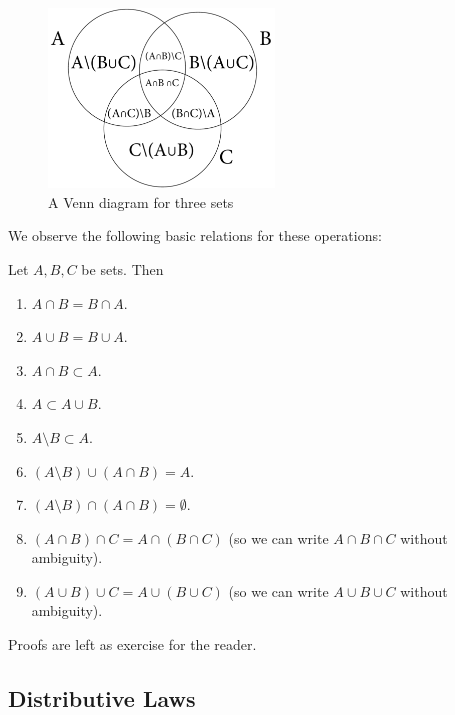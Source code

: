 \begin{figure}[t]
\begin{center}
\includegraphics[width=6cm]{pic/VennDiagram.pdf}
\end{center}
\caption{A Venn diagram for three sets}
\label{figvenndiag}
\end{figure}

We observe the following basic relations for these operations:
\begin{lemma}
Let $A,B,C$ be sets. Then
\begin{enumerate}
\item $A\cap B=B\cap A$.
\item $A\cup B=B\cup A$.
\item $A\cap B\subset A$.
\item $A\subset A\cup B$.
\item $A\setminus B\subset A$.
\item $(A\setminus B)\cup (A\cap B)=A$.
\item $(A\setminus B)\cap (A\cap B)=\emptyset$.
\item $(A\cap B)\cap C=A\cap (B\cap C)$ (so we can write $A\cap B\cap C$
without ambiguity).
\item $(A\cup B)\cup C=A\cup (B\cup C)$ (so we can write $A\cup B\cup C$
without ambiguity).
\end{enumerate}
\end{lemma}
Proofs are left as exercise for the reader.

\subsection{Distributive Laws}

